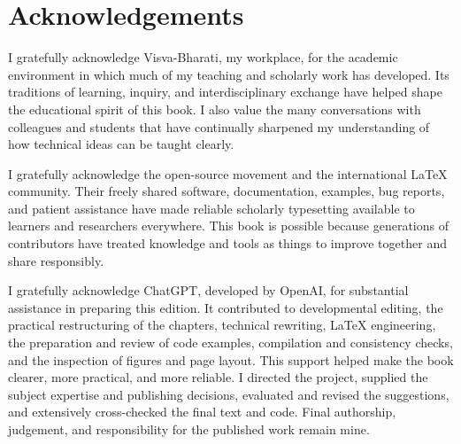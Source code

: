 \chapter*{Acknowledgements}

I gratefully acknowledge Visva-Bharati, my workplace, for the academic
environment in which much of my teaching and scholarly work has developed.
Its traditions of learning, inquiry, and interdisciplinary exchange have
helped shape the educational spirit of this book. I also value the many
conversations with colleagues and students that have continually sharpened
my understanding of how technical ideas can be taught clearly.

I gratefully acknowledge the open-source movement and the international
\LaTeX{} community. Their freely shared software, documentation, examples,
bug reports, and patient assistance have made reliable scholarly typesetting
available to learners and researchers everywhere. This book is possible
because generations of contributors have treated knowledge and tools as
things to improve together and share responsibly.

I gratefully acknowledge ChatGPT, developed by OpenAI, for substantial
assistance in preparing this edition. It contributed to developmental editing,
the practical restructuring of the chapters, technical rewriting, \LaTeX{}
engineering, the preparation and review of code examples, compilation and
consistency checks, and the inspection of figures and page layout. This support
helped make the book clearer, more practical, and more reliable. I directed the
project, supplied the subject expertise and publishing decisions, evaluated and
revised the suggestions, and extensively cross-checked the final text and code.
Final authorship, judgement, and responsibility for the published work remain
mine.
